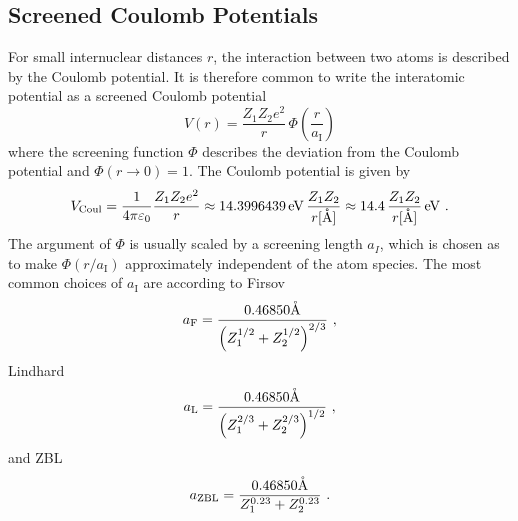 
\subsection{Screened Coulomb Potentials}
%
For small internuclear distances $r$, the interaction between two atoms is described by the Coulomb potential.
It is therefore common to write the interatomic potential as a screened Coulomb potential
%
\begin{equation}
    \label{eq:sn_screened_coulomb}
    V(r) = \frac{Z_1 Z_2 e^2}{r} \, \Phi\left( \frac{r}{a_\mathrm{I}} \right)
\end{equation}
%
where the screening function $\Phi$ describes the deviation from the Coulomb potential and $\Phi(r \rightarrow 0) = 1$.
The Coulomb potential is given by
%
\begin{equation}
    \label{eq:sn_coulomb}
    V_\mathrm{Coul} = \frac{1}{4 \pi \varepsilon_0} \frac{Z_1 Z_2 e^2}{r} \approx
        14.3996439 \, \mathrm{eV} \, \frac{Z_1 Z_2}{r[\mathrm{\mathring{\mathrm{A}}}]} \approx
        14.4 \, \frac{Z_1 Z_2}{r[\mathrm{\mathring{\mathrm{A}}}]} \, \mathrm{eV} ~.
\end{equation}
%
The argument of $\Phi$ is usually scaled by a screening length $a_I$, which is chosen as to make $\Phi(r/a_\mathrm{I})$ approximately independent of the atom species.
The most common choices of $a_\mathrm{I}$ are according to Firsov \cite{Fir58}
%
\begin{equation}
    \label{eq:sn_aF}
    a_\mathrm{F} = \frac{ 0.46850 \mathring{\mathrm{A}} }{ \left( Z_1^{1/2} + Z_2^{1/2} \right) ^ {2/3} } ~,
\end{equation}
%
Lindhard \cite{Lin68}
%
\begin{equation}
    \label{eq:sn_aL}
    a_\mathrm{L} = \frac{ 0.46850 \mathring{\mathrm{A}} }{ \left( Z_1^{2/3} + Z_2^{2/3} \right) ^ {1/2} } ~,
\end{equation}
%
and ZBL \cite{ZBL85}
%
\begin{equation}
    \label{eq:sn_aZBL}
    a_\mathrm{ZBL} = \frac{ 0.46850 \mathring{\mathrm{A}} }{ Z_1^{0.23} + Z_2^{0.23} } ~.
\end{equation}

